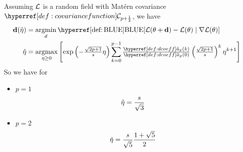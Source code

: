 \begin{theorem}
	Assuming \(\mathcal{L}\) is a random field with Matérn covariance
	\(\C_{p+\frac12}\), we have
	\begin{align*}
		\step(\hat{\lr})
		&= \argmin_{d}
		\BLUE[\Loss(\param + \step) - \Loss(\param)\mid \grad\Loss(\param)]\\
		\hat{\lr}
		&= \argmax_{\lr\ge0}\left[
			\exp\left(-\tfrac{\sqrt{2p+1}}{s}\lr\right)
			\sum_{k=0}^{p-1}\tfrac{\dcoeff(k)}{\dcoeff(0)}\left(\tfrac{\sqrt{2p+1}}{s}\right)^k \lr^{k+1}
		\right]
	\end{align*}
	So we have for
	\begin{itemize}
		\item \(p=1\)
		\begin{equation*}
			\hat{\eta} = \frac{s}{\sqrt{3}}
		\end{equation*}

		\item \(p=2\)
		\begin{equation*}
			\hat{\eta}
			= \frac{s}{\sqrt{5}}\frac{1+\sqrt{5}}2
		\end{equation*}
	\end{itemize}
\end{theorem}

